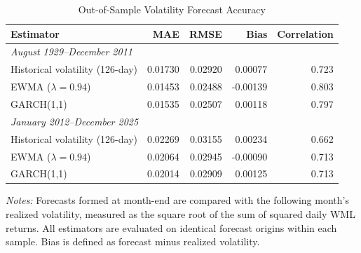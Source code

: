 
\begin{table}[htbp]
\centering
\caption{Out-of-Sample Volatility Forecast Accuracy}
\label{tab:forecast_accuracy}
\small
\begin{tabular}{lrrrr}
\toprule
Estimator & MAE & RMSE & Bias & Correlation \\
\midrule
\multicolumn{5}{l}{\textit{August 1929--December 2011}} \\
Historical volatility (126-day)
    & 0.01730 & 0.02920 & 0.00077 & 0.723 \\
EWMA ($\lambda=0.94$)
    & 0.01453 & 0.02488 & -0.00139 & 0.803 \\
GARCH(1,1)
    & 0.01535 & 0.02507 & 0.00118 & 0.797 \\
\midrule
\multicolumn{5}{l}{\textit{January 2012--December 2025}} \\
Historical volatility (126-day)
    & 0.02269 & 0.03155 & 0.00234 & 0.662 \\
EWMA ($\lambda=0.94$)
    & 0.02064 & 0.02945 & -0.00090 & 0.713 \\
GARCH(1,1)
    & 0.02014 & 0.02909 & 0.00125 & 0.713 \\
\bottomrule
\end{tabular}

\vspace{0.2cm}
\begin{minipage}{0.95\textwidth}
\footnotesize
\textit{Notes:} Forecasts formed at month-end are
compared with the following month's realized
volatility, measured as the square root of the sum
of squared daily WML returns. All estimators
are evaluated on identical forecast origins within
each sample. Bias is defined as forecast minus
realized volatility.
\end{minipage}
\end{table}
